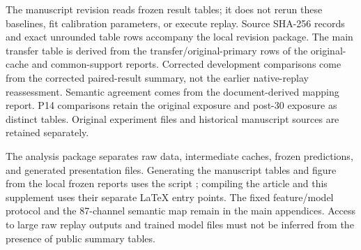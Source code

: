 \documentclass[10pt,a4paper]{article}
\begin{document}
The manuscript revision reads frozen result tables; it does not rerun these baselines, fit calibration parameters, or execute replay. Source SHA-256 records and exact unrounded table rows accompany the local revision package. The main transfer table is derived from the transfer/original-primary rows of the original-cache and common-support reports. Corrected development comparisons come from the corrected paired-result summary, not the earlier native-replay reassessment. Semantic agreement comes from the document-derived mapping report. P14 comparisons retain the original exposure and post-30 exposure as distinct tables. Original experiment files and historical manuscript sources are retained separately.

The analysis package separates raw data, intermediate caches, frozen predictions, and generated presentation files. Generating the manuscript tables and figure from the local frozen reports uses the script ; compiling the article and this supplement uses their separate LaTeX entry points. The fixed feature/model protocol and the 87-channel semantic map remain in the main appendices. Access to large raw replay outputs and trained model files must not be inferred from the presence of public summary tables.
\end{document}
